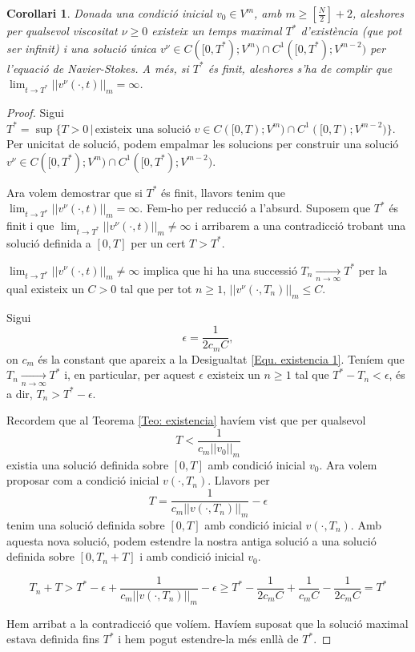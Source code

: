 \documentclass{article}
\numberwithin{equation}{section}
\newtheorem{corollari}{Corol\textperiodcentered lari}[section]
\begin{document}
\begin{corollari}\label{Cor: existencia global}
Donada una condici\'{o} inicial $v_0\in V^m$, amb $m\geq\left[\frac{N}{2}\right]+2$, aleshores per qualsevol viscositat $\nu\geq0$ existeix un temps maximal $T^*$ d'exist\`{e}ncia (que pot ser infinit) i una soluci\'{o} \'{u}nica $v^{\nu}\in C([0,T^*);V^m)\cap C^1([0,T^*);V^{m-2})$ per l'equaci\'{o} de Navier-Stokes. A m\'{e}s, si $T^*$ \'{e}s finit, aleshores s'ha de complir que $\lim_{t\to T^*}||v^{\nu}(\cdot,t)||_m=\infty$.
\end{corollari}
\begin{proof}
Sigui $T^*=\sup\{T>0\,|\,\text{existeix una soluci\'{o} }v\in C([0,T);V^m)\cap C^1([0,T);V^{m-2})\}$. Per unicitat de soluci\'{o}, podem empalmar les solucions per construir una soluci\'{o} $v^{\nu}\in C([0,T^*);V^m)\cap C^1([0,T^*);V^{m-2})$.

Ara volem demostrar que si $T^*$ \'{e}s finit, llavors tenim que $\lim_{t\to T^*}||v^{\nu}(\cdot,t)||_m=\infty$. Fem-ho per reducci\'{o} a l'absurd. Suposem que $T^*$ \'{e}s finit i que $\lim_{t\to T^*}||v^{\nu}(\cdot,t)||_m\neq\infty$ i arribarem a una contradicci\'{o} trobant una soluci\'{o} definida a $[0,T]$ per un cert $T>T^*$.

$\lim_{t\to T^*}||v^{\nu}(\cdot,t)||_m\neq\infty$ implica que hi ha una successi\'{o} $T_n\xrightarrow[n\to\infty]{}T^*$ per la qual existeix un $C>0$ tal que per tot $n\geq1$, $||v^{\nu}(\cdot,T_n)||_m\leq C$.

Sigui
\[\epsilon=\frac{1}{2c_mC},\]
on $c_m$ \'{e}s la constant que apareix a la Desigualtat \eqref{Equ. existencia 1}. Ten\'{i}em que $T_n\xrightarrow[n\to\infty]{}T^*$ i, en particular, per aquest $\epsilon$ existeix un $n\geq1$ tal que $T^*-T_n<\epsilon$, \'{e}s a dir, $T_n>T^*-\epsilon$.

Recordem que al Teorema \ref{Teo: existencia} hav\'{i}em vist que per qualsevol
\[T<\frac{1}{c_m||v_0||_m}\]
existia una soluci\'{o} definida sobre $[0,T]$ amb condici\'{o} inicial $v_0$. Ara volem proposar com a condici\'{o} inicial $v(\cdot,T_n)$. Llavors per
\[T=\frac{1}{c_m||v(\cdot,T_n)||_m}-\epsilon\]
tenim una soluci\'{o} definida sobre $[0,T]$ amb condici\'{o} inicial $v(\cdot,T_n)$. Amb aquesta nova soluci\'{o}, podem estendre la nostra antiga soluci\'{o} a una soluci\'{o} definida sobre $[0,T_n+T]$ i amb condici\'{o} inicial $v_0$.

\[T_n+T>T^*-\epsilon+\frac{1}{c_m||v(\cdot,T_n)||_m}-\epsilon\geq T^*-\frac{1}{2c_mC}+\frac{1}{c_mC}-\frac{1}{2c_mC}=T^*\]

Hem arribat a la contradicci\'{o} que vol\'{i}em. Hav\'{i}em suposat que la soluci\'{o} maximal estava definida fins $T^*$ i hem pogut estendre-la m\'{e}s enll\`{a} de $T^*$.
\end{proof}
\end{document}
